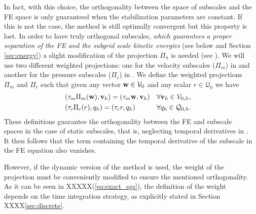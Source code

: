 In fact, with this choice, the orthogonality between the space of subscales and the FE space is only guaranteed when the stabilization parameters are constant. If this is not the case, the method is still optimally convergent \cite{Codina_2008a} but this property is lost. In order to have truly orthogonal subscales, \emph{which guarantees a proper separation of the FE and the subgrid scale kinetic energies} (see below and Section \ref{sec:energy}) a slight modification of the projection $\Pi_h$ is needed (see \cite{Codina_2008a}). We will use two different weighted projections: one for the velocity subscales ($\Pi_m$) in  and another for the pressure subscales ($\Pi_c$) in . We define the weighted projections $\Pi_m$ and $\Pi_c$ such that given any vector ${\bf w}\in\mathcal{V}_0$ and any scalar $r\in\mathcal{Q}_0$ we have
\begin{align}
\label{eq-Pi_tau_m}
&(\tau_m\Pi_m({\bf w}),{\bf v}_h)=(\tau_m{\bf w},{\bf v}_h)&&\forall{\bf v}_h\in\mathcal{V}_{0,h},\\
\label{eq-Pi_tau_c}
&(\tau_c\Pi_c(r),q_h)=(\tau_cr,q_h)&&\forall q_h\in\mathcal{Q}_{0,h}.
\end{align}
These definitions guarantee the orthogonality between the FE and subscale spaces in the case of static subscales, that is, neglecting temporal derivatives in . It then follows that the term containing the temporal derivative of the subscale in the FE equation  also vanishes.

However, if the dynamic version of the method is used, the weight of the projection  must be conveniently modified to ensure the mentioned orthogonality. As it can be seen in XXXXX(\ref{eq:exact_sgs}), the definition of the weight depends on the time integration strategy, as explicitly stated in Section XXXX\ref{sec:discrete}.